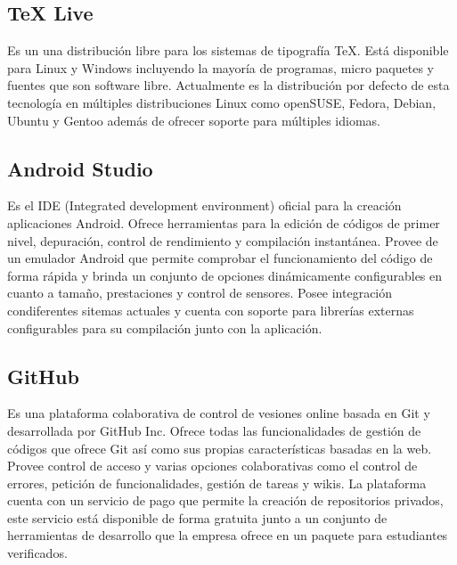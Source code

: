 \documentclass{article}
\begin{document}
    \subsection{TeX Live}
        Es un una distribución libre para los sistemas de tipografía TeX. Está disponible para Linux y Windows incluyendo la mayoría de programas, micro paquetes y fuentes que son software libre. Actualmente es la distribución por defecto de esta tecnología en múltiples distribuciones Linux como openSUSE, Fedora, Debian, Ubuntu y Gentoo además de ofrecer soporte para múltiples idiomas.

    \subsection{Android Studio}
        Es el IDE (Integrated development environment) oficial para la creación aplicaciones Android. Ofrece herramientas para la edición de códigos de primer nivel, depuración, control de rendimiento y compilación instantánea. Provee de un emulador Android que permite comprobar el funcionamiento del código de forma rápida y brinda un conjunto de opciones dinámicamente configurables en cuanto a tamaño, prestaciones y control de sensores. Posee integración condiferentes sitemas actuales y cuenta con soporte para librerías externas configurables para su compilación junto con la aplicación.

    \subsection{GitHub}
        Es una plataforma colaborativa de control de vesiones online basada en Git y desarrollada por GitHub Inc. Ofrece todas las funcionalidades de gestión de códigos que ofrece Git así como sus propias características basadas en la web. Provee control de acceso y varias opciones colaborativas como el control de errores, petición de funcionalidades, gestión de tareas y wikis. La plataforma cuenta con un servicio de pago que permite la creación de repositorios privados, este servicio está disponible de forma gratuita junto a un conjunto de herramientas de desarrollo que la empresa ofrece en un paquete para estudiantes verificados.



\end{document}
